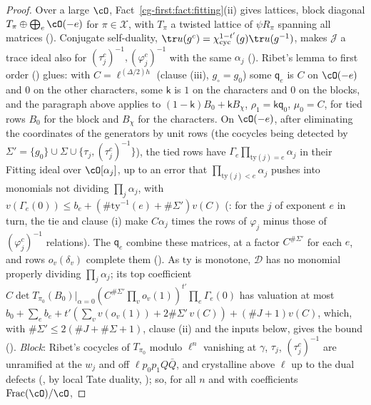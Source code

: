 \begin{proof}
Over a large $\cO$, Fact~\ref{cg-first:fact:fitting}(ii) gives lattices, block diagonal
$T_\pi\oplus\bigoplus_e\cO(-e)$ for $\pi\in\mathcal X$, with $T_\pi$ a twisted lattice of $\psi R_\pi$ spanning
all matrices (). Conjugate self-duality,
$\tr u(g^c)=\chi_{\mathrm{cyc}}^{1-t'}(g)\tr u(g^{-1})$, makes $\mathcal J$ a trace ideal also for
$(\tau_j^c)^{-1},(\varphi_j^c)^{-1}$ with the same $\alpha_j$ ().
Ribet's lemma to first order () glues: with
$C=\ell^{(\Delta/2)h}$ (clause (iii), $g_\circ=g_0$) some $\mathsf q_e$ is $C$ on $\cO(-e)$ and $0$ on the other
characters, some $\mathsf k$ is $1$ on the characters and $0$ on the blocks, and the paragraph above applies to
$(1-\mathsf k)B_0+\mathsf kB_\chi$, $\rho_1=\mathsf k\mathsf q_0$, $\mu_0=C$, for tied rows $B_0$ for the block and $B_\chi$ for the characters. On $\cO(-e)$, after eliminating the coordinates of the generators by unit rows
(the cocycles being detected by $\Sigma'=\{g_0\}\cup\Sigma\cup\{\tau_j,(\tau_j^c)^{-1}\}$), the tied rows
have $\Gamma_e\prod_{\mathrm{ty}(j)=e}\alpha_j$ in their Fitting ideal over $\cO[\alpha_j]$, up to an error that
$\prod_{\mathrm{ty}(j)<e}\alpha_j$ pushes into monomials not dividing $\prod_j\alpha_j$, with
$v(\Gamma_e(0))\le b_e+(\#\mathrm{ty}^{-1}(e)+\#\Sigma')v(C)$
(: for the $j$ of exponent $e$ in turn, the tie and
clause (i) make $C\alpha_j$ times the rows of $\varphi_j$ minus those of $(\varphi_j^c)^{-1}$ relations). The $\mathsf q_e$ combine these matrices, at a factor $C^{\#\Sigma'}$ for
each $e$, and rows $o_v(\delta_v)$ complete them (). As
$\mathrm{ty}$ is monotone, $\mathcal D$ has no monomial properly dividing $\prod_j\alpha_j$; its top coefficient
$C\det T_{\pi_0}(B_0)|_{\alpha=0}(C^{\#\Sigma'}\prod_vo_v(1))^{t'}\prod_e\Gamma_e(0)$ has valuation at most
$b_0+\sum_eb_e+t'(\sum_vv(o_v(1))+2\#\Sigma'\,v(C))+(\#J+1)v(C)$, which, with
$\#\Sigma'\le2(\#J+\#\Sigma+1)$, clause (ii) and the inputs below, gives the bound
().
\emph{Block}: Ribet's cocycles of $T_{\pi_0}$ modulo $\ell^n$ vanishing at $\gamma$, $\tau_j$,
$(\tau_j^c)^{-1}$ are unramified at the $w_j$ and off $\ell p_0p_1Q\bar Q$, and crystalline above $\ell$ up
to the dual defects (, by local Tate duality,
); so, for all $n$ and with coefficients $\mathrm{Frac}(\cO)/\cO$,

\end{proof}
